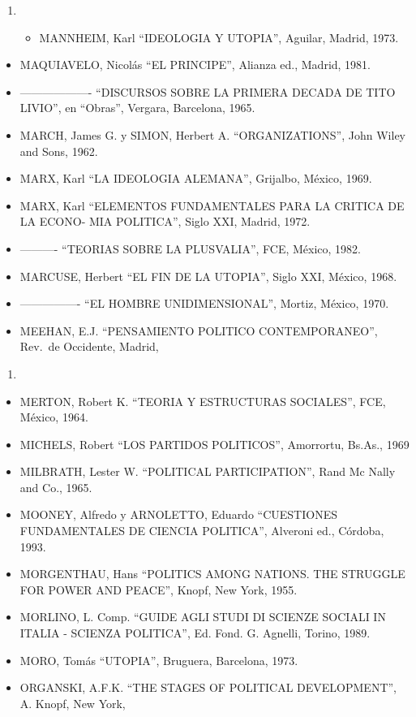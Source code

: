 \documentclass[
]{book}
\providecommand{\tightlist}{%
  \setlength{\itemsep}{0pt}\setlength{\parskip}{0pt}}
\begin{document}
\begin{enumerate}
\def\labelenumi{\arabic{enumi}.}
\setcounter{enumi}{1962}
\item
  \begin{itemize}
  \tightlist
  \item
    MANNHEIM, Karl ``IDEOLOGIA Y UTOPIA'', Aguilar, Madrid, 1973.
  \end{itemize}
\end{enumerate}

\begin{itemize}
\tightlist
\item
  MAQUIAVELO, Nicolás ``EL PRINCIPE'', Alianza ed., Madrid, 1981.
\item
  ------------------- ``DISCURSOS SOBRE LA PRIMERA DECADA DE TITO LIVIO'', en ``Obras'',
  Vergara, Barcelona, 1965.
\item
  MARCH, James G. y SIMON, Herbert A. ``ORGANIZATIONS'', John Wiley and Sons, 1962.
\item
  MARX, Karl ``LA IDEOLOGIA ALEMANA'', Grijalbo, México, 1969.
\item
  MARX, Karl ``ELEMENTOS FUNDAMENTALES PARA LA CRITICA DE LA ECONO- MIA
  POLITICA'', Siglo XXI, Madrid, 1972.
\item
  ---------- ``TEORIAS SOBRE LA PLUSVALIA'', FCE, México, 1982.
\item
  MARCUSE, Herbert ``EL FIN DE LA UTOPIA'', Siglo XXI, México, 1968.
\item
  ---------------- ``EL HOMBRE UNIDIMENSIONAL'', Mortiz, México, 1970.
\item
  MEEHAN, E.J. ``PENSAMIENTO POLITICO CONTEMPORANEO'', Rev.~de Occidente, Madrid,
\end{itemize}

\begin{enumerate}
\def\labelenumi{\arabic{enumi}.}
\setcounter{enumi}{1972}
\tightlist
\item
\end{enumerate}

\begin{itemize}
\tightlist
\item
  MERTON, Robert K. ``TEORIA Y ESTRUCTURAS SOCIALES'', FCE, México, 1964.
\item
  MICHELS, Robert ``LOS PARTIDOS POLITICOS'', Amorrortu, Bs.As., 1969
\item
  MILBRATH, Lester W. ``POLITICAL PARTICIPATION'', Rand Mc Nally and Co., 1965.
\item
  MOONEY, Alfredo y ARNOLETTO, Eduardo ``CUESTIONES FUNDAMENTALES DE CIENCIA
  POLITICA'', Alveroni ed., Córdoba, 1993.
\item
  MORGENTHAU, Hans ``POLITICS AMONG NATIONS. THE STRUGGLE FOR POWER AND
  PEACE'', Knopf, New York, 1955.
\item
  MORLINO, L. Comp. ``GUIDE AGLI STUDI DI SCIENZE SOCIALI IN ITALIA - SCIENZA
  POLITICA'', Ed. Fond. G. Agnelli, Torino, 1989.
\item
  MORO, Tomás ``UTOPIA'', Bruguera, Barcelona, 1973.
\item
  ORGANSKI, A.F.K. ``THE STAGES OF POLITICAL DEVELOPMENT'', A. Knopf, New York,
\end{itemize}
\end{document}

